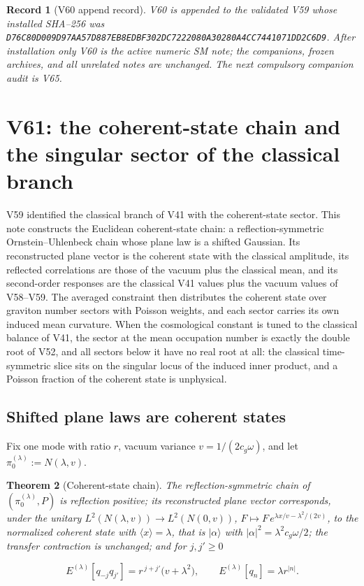 \documentclass[11pt]{article}
\newtheorem{theorem}{Theorem}[section]
\newtheorem{record}[theorem]{Record}
\theoremstyle{remark}
\begin{document}
\begin{record}[V60 append record]
\label{rec:v19v60}
V60 is appended to the validated V59 whose installed SHA--256 was
\texttt{D76C80D009D97AA57D887EB8EDBF302DC7222080A30280A4CC7441071DD2C6D9}.
After installation only V60 is the active numeric SM note; the
companions, frozen archives, and all unrelated notes are unchanged.  The
next compulsory companion audit is V65.
\end{record}


\section{V61: the coherent-state chain and the singular sector of the classical branch}
\label{sec:v19v61}

V59 identified the classical branch of V41 with the coherent-state
sector.  This note constructs the Euclidean coherent-state chain: a
reflection-symmetric Ornstein--Uhlenbeck chain whose plane law is a
shifted Gaussian.  Its reconstructed plane vector is the coherent state
with the classical amplitude, its reflected correlations are those of
the vacuum plus the classical mean, and its second-order responses are
the classical V41 values plus the vacuum values of V58--V59.  The
averaged constraint then distributes the coherent state over graviton
number sectors with Poisson weights, and each sector carries its own
induced mean curvature.  When the cosmological constant is tuned to the
classical balance of V41, the sector at the mean occupation number is
exactly the double root of V52, and all sectors below it have no real
root at all: the classical time-symmetric slice sits on the singular
locus of the induced inner product, and a Poisson fraction of the
coherent state is unphysical.

\subsection{Shifted plane laws are coherent states}

Fix one mode with ratio \(r\), vacuum variance \(v=1/(2c_g\omega)\), and
let \(\pi_0^{(\lambda)}:=N(\lambda,v)\).

\begin{theorem}[Coherent-state chain]
\label{thm:v19v61-chain}
The reflection-symmetric chain of \((\pi_0^{(\lambda)},P)\) is
reflection positive; its reconstructed plane vector corresponds, under
the unitary \(L^2(N(\lambda,v))\to L^2(N(0,v))\),
\(F\mapsto F\,e^{\lambda x/v-\lambda^2/(2v)}\), to the normalized
coherent state with \(\langle x\rangle=\lambda\), that is
\(|\alpha\rangle\) with \(|\alpha|^2=\lambda^2c_g\omega/2\); the
transfer contraction is unchanged; and for \(j,j'\geq0\)

\[
 E^{(\lambda)}[q_{-j}q_{j'}]=r^{\,j+j'}\bigl(v+\lambda^2\bigr),
 \qquad
 E^{(\lambda)}[q_n]=\lambda r^{|n|}.                                    \tag{64.1}
\]
\end{theorem}
\end{document}
